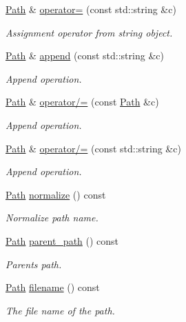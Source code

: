 \begin{DoxyCompactItemize}
\hyperlink{class_d_d4hep_1_1_path}{Path} \& \hyperlink{class_d_d4hep_1_1_path_aa1a61f3b3eab565724525f423fe465e6}{operator=} (const std\+::string \&c)
\begin{DoxyCompactList}\small\item\em Assignment operator from string object. \end{DoxyCompactList}\item 
\hyperlink{class_d_d4hep_1_1_path}{Path} \& \hyperlink{class_d_d4hep_1_1_path_aede85dabc3b61fe22482f3fcf4fd8fad}{append} (const std\+::string \&c)
\begin{DoxyCompactList}\small\item\em Append operation. \end{DoxyCompactList}\item 
\hyperlink{class_d_d4hep_1_1_path}{Path} \& \hyperlink{class_d_d4hep_1_1_path_aeaa34e8637a1d259e32e28691f6baef6}{operator/=} (const \hyperlink{class_d_d4hep_1_1_path}{Path} \&c)
\begin{DoxyCompactList}\small\item\em Append operation. \end{DoxyCompactList}\item 
\hyperlink{class_d_d4hep_1_1_path}{Path} \& \hyperlink{class_d_d4hep_1_1_path_a523dd8b394e298b16ec54d602b85a87d}{operator/=} (const std\+::string \&c)
\begin{DoxyCompactList}\small\item\em Append operation. \end{DoxyCompactList}\item 
\hyperlink{class_d_d4hep_1_1_path}{Path} \hyperlink{class_d_d4hep_1_1_path_a5cf2746d46d1ed329e5deed868c904de}{normalize} () const
\begin{DoxyCompactList}\small\item\em Normalize path name. \end{DoxyCompactList}\item 
\hyperlink{class_d_d4hep_1_1_path}{Path} \hyperlink{class_d_d4hep_1_1_path_a494ed894cb888b82d6c5a75e2c996e2c}{parent\+\_\+path} () const
\begin{DoxyCompactList}\small\item\em Parent\textquotesingle{}s path. \end{DoxyCompactList}\item 
\hyperlink{class_d_d4hep_1_1_path}{Path} \hyperlink{class_d_d4hep_1_1_path_a07842fab1e11e853dad5bab7f1b3a073}{filename} () const
\begin{DoxyCompactList}\small\item\em The file name of the path. \end{DoxyCompactList}\item 

\end{DoxyCompactItemize}
